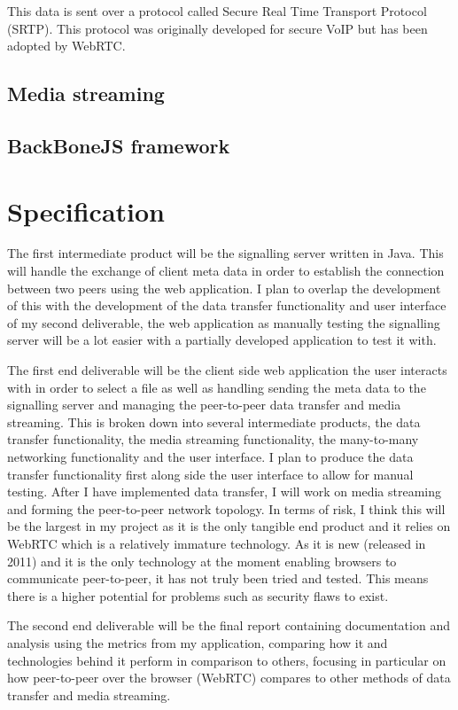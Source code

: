 \documentclass[]{report}
\begin{document}
			This data is sent over a protocol called Secure Real Time Transport Protocol (SRTP). This protocol was originally developed for secure VoIP but has been adopted by WebRTC. 
		
		\subsection*{Media streaming}
		\subsection*{BackBoneJS framework}
			
	\section{Specification}
		The first intermediate product will be the signalling server written in Java. This will handle the exchange of client meta data in order to establish the connection between two peers using the web application. I plan to overlap the development of this with the development of the data transfer functionality and user interface of my second deliverable, the web application as manually testing the signalling server will be a lot easier with a partially developed application to test it with.
			
		The first end deliverable will be the client side web application the user interacts with in order to select a file as well as handling sending the meta data to the signalling server and managing the peer-to-peer data transfer and media streaming. This is broken down into several intermediate products, the data transfer functionality, the media streaming functionality, the many-to-many networking functionality and the user interface. I plan to produce the data transfer functionality first along side the user interface to allow for manual testing. After I have implemented data transfer, I will work on media streaming and forming the peer-to-peer network topology. In terms of risk, I think this will be the largest in my project as it is the only tangible end product and it relies on WebRTC which is a relatively immature technology. As it is new (released in 2011) and it is the only technology at the moment enabling browsers to communicate peer-to-peer, it has not truly been tried and tested. This means there is a higher potential for problems such as security flaws to exist. 
			
		The second end deliverable will be the final report containing documentation and analysis using the metrics	from my application, comparing how it and technologies behind it perform in comparison to others, focusing in particular on how peer-to-peer over the browser (WebRTC) compares to other methods of data transfer and media streaming.
			
\end{document}
